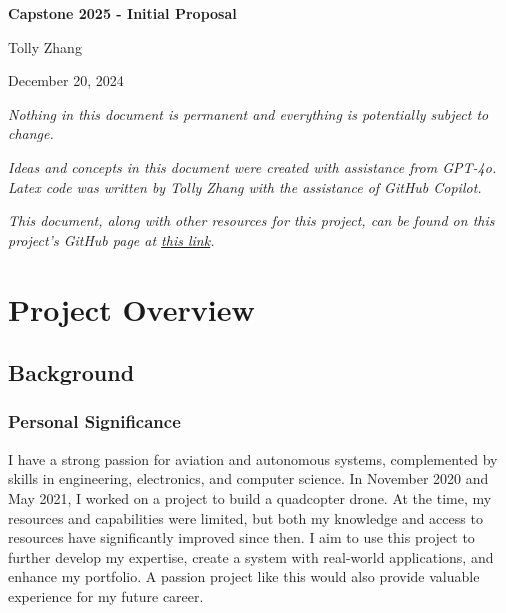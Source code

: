 \documentclass[12pt]{article}
\begin{document}
\begin{titlepage}
    \centering
    \vfill
    \vspace*{2.5in}
    {\Huge\bfseries Capstone 2025 - Initial Proposal \par}
    \vspace{0.2in}
    {\LARGE Tolly Zhang \par}    
    \vspace{0.2in}
    {\LARGE December 20, 2024 \par}
    \vfill
\end{titlepage}

\newpage
\thispagestyle{empty}
\begin{center}
    \vspace*{\fill}
    \Large\textit{Nothing in this document is permanent and everything is potentially subject to change.}

    \Large\textit{Ideas and concepts in this document were created with assistance from GPT-4o. Latex code was written by Tolly Zhang with the assistance of GitHub Copilot.}

    \Large\textit{This document, along with other resources for this project, can be found on this project's GitHub page at \href{https://github.com/Tolly-Zhang/FH-Capstone-2025}{this link}.}
    \vspace*{\fill}
\end{center}

\newpage
{}
\setcounter{page}{1}

\section{Project Overview}

\subsection{Background}

\subsubsection{Personal Significance}
I have a strong passion for aviation and autonomous systems, complemented by skills in engineering, electronics, and computer science. In November 2020 and May 2021, I worked on a project to build a quadcopter drone. At the time, my resources and capabilities were limited, but both my knowledge and access to resources have significantly improved since then. I aim to use this project to further develop my expertise, create a system with real-world applications, and enhance my portfolio. A passion project like this would also provide valuable experience for my future career.
\end{document}
